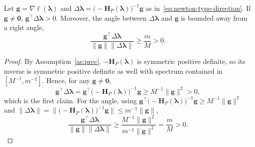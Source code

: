 \begin{lemma}
    Let $\mathbf{g}=\nabla\ell(\bm{\lambda})$ and $\Delta \bm{\lambda}=\bigl(-\mathbf{H}_{P}(\bm{\lambda})\bigr)^{-1}\mathbf{g}$ as in~\eqref{eq:newton-type-direction}. If $\mathbf{g}\neq \bm{0}$, $\mathbf{g}^{\top}\Delta\bm{\lambda}>0$. Moreover, the angle between $\Delta\bm{\lambda}$ and $\mathbf{g}$ is bounded away from a right angle,
    \begin{equation}
        \frac{\mathbf{g}^{\top}\Delta\bm{\lambda}}{\|\mathbf{g}\|\|\Delta\bm{\lambda}\|}\geq \frac{m}{M}>0.
    \end{equation}
    \label{lem:ascent-direction}
\end{lemma}

\begin{proof}
    By Assumption~\ref{as:prec}, $-\mathbf{H}_{P}(\bm{\lambda})$ is symmetric positive definite, so its inverse is symmetric positive definite as well with spectrum contained in $[M^{-1}, m^{-1}]$. Hence, for any $\mathbf{g}\neq \bm{0}$,
    \begin{equation}
        \mathbf{g}^{\top}\Delta\bm{\lambda}=\mathbf{g}^{\top}\bigl(-\mathbf{H}_{P}(\bm{\lambda})\bigr)^{-1}\mathbf{g}\geq M^{-1}\|\mathbf{g}\|^{2}>0,
    \end{equation}
    which is the first claim. For the angle, using $\mathbf{g}^{\top}\bigl(-\mathbf{H}_{P}(\bm{\lambda})\bigr)^{-1}\mathbf{g}\geq M^{-1}\|\mathbf{g}\|^{2}$ and $\|\Delta\bm{\lambda}\|=\|\bigl(-\mathbf{H}_{P}(\bm{\lambda})\bigr)^{-1}\mathbf{g}\|\leq m^{-1}\|\mathbf{g}\|$,
    \begin{equation}
        \frac{\mathbf{g}^{\top}\Delta\bm{\lambda}}{\|\mathbf{g}\|\|\Delta\bm{\lambda}\|}\geq\frac{M^{-1}\|\mathbf{g}\|^{2}}{m^{-1}\|\mathbf{g}\|^{2}}= \frac{m}{M}>0.
    \end{equation}
\end{proof}

